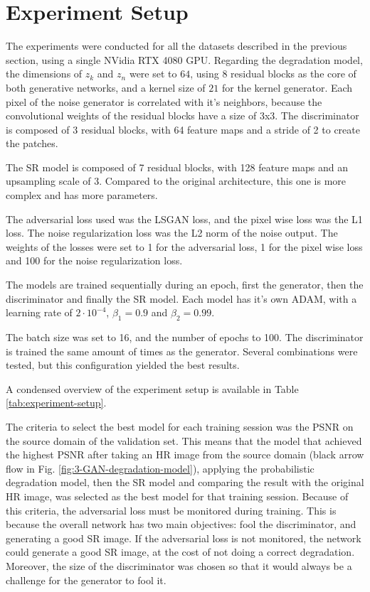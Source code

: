 \section{Experiment Setup}

The experiments were conducted for all the datasets described in the previous section, using a single NVidia RTX 4080 GPU.
Regarding the degradation model, the dimensions of $z_k$ and $z_n$ were set to $64$, using 8 residual blocks as the core of both generative networks, and a kernel size of $21$ for the kernel generator. Each pixel of the noise generator is correlated with it's neighbors, because the convolutional weights of the residual blocks have a size of 3x3. The discriminator is composed of 3 residual blocks, with 64 feature maps and a stride of 2 to create the patches.

The SR model is composed of 7 residual blocks, with 128 feature maps and an upsampling scale of 3. Compared to the original architecture, this one is more complex and has more parameters.

The adversarial loss used was the LSGAN loss, and the pixel wise loss was the L1 loss. The noise regularization loss was the L2 norm of the noise output. The weights of the losses were set to 1 for the adversarial loss, 1 for the pixel wise loss and 100 for the noise regularization loss.

The models are trained sequentially during an epoch, first the generator, then the discriminator and finally the SR model. Each model has it's own ADAM, with a learning rate of $2 \cdot 10^{-4}$,
 $\beta_1 = 0.9$ and $\beta_2 = 0.99$.

The batch size was set to 16, and the number of epochs to 100. 
The discriminator is trained the same amount of times as the generator. Several combinations were tested, but this configuration yielded the best results.

A condensed overview of the experiment setup is available in Table \ref{tab:experiment-setup}.

The criteria to select the best model for each training session was the PSNR on the source domain of the validation set. 
This means that the model that achieved the highest PSNR after taking an HR image from the source domain (black arrow flow in Fig. \ref{fig:3-GAN-degradation-model}), applying the probabilistic degradation model, then the SR model and comparing the result with the original HR image, was selected as the best model for that training session. Because of this criteria, the adversarial loss must be monitored during training. This is because the overall network has two main objectives: fool the discriminator, and generating a good SR image. If the adversarial loss is not monitored, the network could generate a good SR image, at the cost of not doing a correct degradation. Moreover, the size of the discriminator was chosen so that it would always be a challenge for the generator to fool it.

